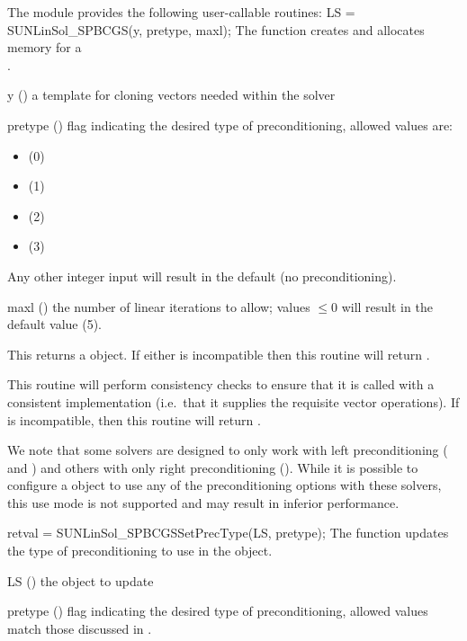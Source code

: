 The module {\sunlinsolspbcgs} provides the following user-callable routines:
{
  LS = SUNLinSol\_SPBCGS(y, pretype, maxl);
}
{
  The function  creates and allocates memory for
  a {\spbcg} \\ \noindent {}.
}
{
  \begin{args}[pretype]
  \item[y] ()
    a template for cloning vectors needed within the solver
  \item[pretype] ()
    flag indicating the desired type of preconditioning, allowed
    values are:
    \begin{itemize}
    \item {} (0)
    \item {} (1)
    \item {} (2)
    \item {} (3)
    \end{itemize}
    Any other integer input will result in the default (no
    preconditioning).
  \item[maxl] ()
    the number of linear iterations to allow; values $\le0$ will
    result in the default value (5).
  \end{args}
}
{
  This returns a  object.  If either  is
  incompatible then this routine will return .
}
{
  This routine will perform consistency checks to ensure that it is
  called with a consistent {\nvector} implementation (i.e.~that it
  supplies the requisite vector operations).  If  is
  incompatible, then this routine will return .

  We note that some {\sundials} solvers are designed to only work
  with left preconditioning ({\ida} and {\idas}) and others with only
  right preconditioning ({\kinsol}). While it is possible to configure
  a {\sunlinsolspbcgs} object to use any of the preconditioning options
  with these solvers, this use mode is not supported and may result in
  inferior performance.
}
{
  retval = SUNLinSol\_SPBCGSSetPrecType(LS, pretype);
}
{
  The function  updates the type of
  preconditioning to use in the {\sunlinsolspbcgs} object.
}
{
  \begin{args}[pretype]
  \item[LS] ()
    the {\sunlinsolspbcgs} object to update
  \item[pretype] ()
    flag indicating the desired type of preconditioning, allowed
    values match those discussed in .
  \end{args}
}
